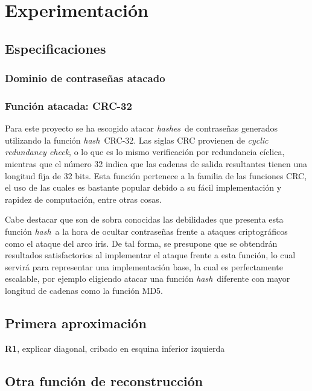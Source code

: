 \documentclass[12pt,spanish,listoffigures,listoftables]{tfgetsinf}
\newcommand{\hash}{\textit{hash}}
\newcommand{\hashes}{\textit{hashes}}
\begin{document}
\chapter{Experimentación}

\section{Especificaciones}

\subsection{Dominio de contraseñas atacado}




\subsection{Función atacada: CRC-32} \label{crc32}

Para este proyecto se ha escogido atacar \hashes~de contraseñas generados utilizando la función \hash~CRC-32. Las siglas CRC provienen de \textit{cyclic redundancy check}, o lo que es lo mismo verificación por redundancia cíclica, mientras que el número 32 indica que las cadenas de salida resultantes tienen una longitud fija de 32 bits. Esta función pertenece a la familia de las funciones CRC, el uso de las cuales es bastante popular debido a su fácil implementación y rapidez de computación, entre otras cosas.

Cabe destacar que son de sobra conocidas las debilidades que presenta esta función \hash~a la hora de ocultar contraseñas frente a ataques criptográficos como el ataque del arco iris. De tal forma, se presupone que se obtendrán resultados satisfactorios al implementar el ataque frente a esta función, lo cual servirá para representar una implementación base, la cual es perfectamente escalable, por ejemplo eligiendo atacar una función \hash~diferente con mayor longitud de cadenas como la función MD5.

\section{Primera aproximación}

\textbf{R1}, explicar diagonal, cribado en esquina inferior izquierda

\section{Otra función de reconstrucción}
\end{document}
